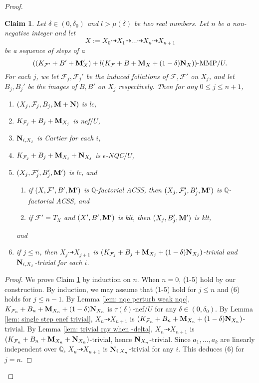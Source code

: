 \documentclass[11pt]{amsart}
\numberwithin{equation}{section}
\newcommand{\Mm}{{\bf{M}}}
\newcommand{\Nn}{{\bf{N}}}
\newcommand{\Qq}{\mathbb{Q}}
\newcommand{\Ff}{\mathcal{F}}
\newtheorem{claim}[thm]{Claim}
\theoremstyle{definition}
\theoremstyle{definition}
\theoremstyle{definition}
\begin{document}
\begin{proof}
\begin{claim}\label{claim: kx+kf mmp trivial}
Let $\delta\in (0,\delta_0)$ and $l>\mu(\delta)$ be two real numbers. Let $n$ be a non-negative integer and let 
$$X:=X_0\dashrightarrow X_1\dashrightarrow\dots\dashrightarrow X_n\dashrightarrow X_{n+1}$$
be a sequence of steps of a
$$((K_{\Ff'}+B'+\Mm'_X)+l(K_{\Ff}+B+\Mm_X+(1-\delta)\Nn_X))\text{-MMP}/U.$$
For each $j$, we let $\Ff_j,\Ff_j'$ be the induced foliations of $\Ff,\Ff'$ on $X_j$, and let $B_j,B_j'$ be the images of $B,B'$ on $X_j$ respectively. Then for any $0\leq j\leq n+1$,
\begin{enumerate}
\item $(X_j,\Ff_j,B_j,\Mm+\Nn)$ is lc,
\item $K_{\Ff_j}+B_j+\Mm_{X_j}$ is nef$/U$,
\item $\Nn_{i,X_j}$ is Cartier for each $i$,
\item $K_{\Ff_j}+B_j+\Mm_{X_j}+\Nn_{X_j}$ is $\epsilon$-NQC$/U$,
\item $(X_j,\Ff'_j,B_j',\Mm')$ is lc, and
\begin{enumerate}
            \item if $(X,\Ff',B',\Mm')$ is $\Qq$-factorial ACSS, then $(X_j,\Ff'_j,B_j',\Mm')$ is $\Qq$-factorial ACSS, and
            \item if $\Ff'=T_X$ and $(X',B',\Mm')$ is klt, then $(X_j,B_j',\Mm')$ is klt,
\end{enumerate}
and
\item if $j\leq n$, then $X_{j}\dashrightarrow X_{j+1}$ is 
    $(K_{\Ff_j}+B_j+\Mm_{X_j}+(1-\delta)\Nn_{X_j})$-trivial and $\Nn_{i,X_j}$-trivial for each $i$.
\end{enumerate}
\end{claim}
\begin{proof}
We prove Claim \ref{claim: kx+kf mmp trivial} by induction on $n$. When $n=0$, (1-5) hold by our construction. By induction, we may assume that (1-5) hold for $j\leq n$ and (6) holds for $j\leq n-1$. By Lemma \ref{lem: nqc perturb weak nqc}, $K_{\Ff_n}+B_n+\Mm_{X_n}+(1-\delta)\Nn_{X_n}$ is $\tau(\delta)$-nef$/U$ for any $\delta\in (0,\delta_0)$. By Lemma \ref{lem: single step enef trivial}, $X_n\dashrightarrow X_{n+1}$ is  $(K_{\Ff_n}+B_n+\Mm_{X_n}+(1-\delta)\Nn_{X_n})$-trivial. By Lemma \ref{lem: trivial ray when -delta}, $X_n\dashrightarrow X_{n+1}$ is  $(K_{\Ff_n}+B_n+\Mm_{X_n}+\Nn_{X_n})$-trivial, hence $\Nn_{X_n}$-trivial. Since $a_1,\dots,a_k$ are linearly independent over $\mathbb Q$, $X_n\dashrightarrow X_{n+1}$ is  $\Nn_{i,X_n}$-trivial for any $i$. This deduces (6) for $j=n$.


\end{proof}
\end{proof}
\end{document}
